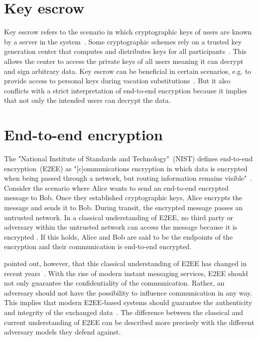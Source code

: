 \documentclass[../main.tex]{subfiles}
\begin{document}
\section{Key escrow}
\label{sec:key-escrow}
Key escrow refers to the scenario in which cryptographic keys of users are known by a server in the system~\cite{Gentry2003}.
Some cryptographic schemes rely on a trusted key generation center that computes and distributes keys for all participants~\cite{Sakai2007, Bethencourt2007}.
This allows the center to access the private keys of all users meaning it can decrypt and sign arbitrary data.
Key escrow can be beneficial in certain scenarios, e.g. to provide access to personal keys during vacation substitutions~\cite{Hagg2022}.
But it also conflicts with a strict interpretation of end-to-end encryption because it implies that not only the intended users can decrypt the data.

\section{End-to-end encryption} 
\label{sec:end-to-end}

The "National Institute of Standards and Technology"~(NIST) defines end-to-end encryption~(E2EE) as 
"[c]ommunications encryption in which data is encrypted when being passed through a network, but routing information remains visible"~\cite[88]{Nieles2017}.
Consider the scenario where Alice wants to send an end-to-end encrypted message to Bob.
Once they established cryptographic keys, Alice encrypts the message and sends it to Bob.
During transit, the encrypted message passes an untrusted network.
In a classical understanding of E2EE, no third party or adversary within the untrusted network can access the message because it is encrypted \cite{Ermoshina2016}.
If this holds, Alice and Bob are said to be the endpoints of the encryption and their communication is end-to-end encrypted.

\citeauthor{Hale2022} pointed out, however, that this classical understanding of E2EE has changed in recent years~\cite{Hale2022}. 
With the rise of modern instant messaging services, E2EE should not only guarantee the confidentiality of the communication.
Rather, an adversary should not have the possibility to influence communication in any way.
This implies that modern E2EE-based systems should guarantee the authenticity and integrity of the exchanged data~\cite{Hale2022}. 
The difference between the classical and current understanding of E2EE can be described more precisely with the different adversary models they defend against.
\end{document}
